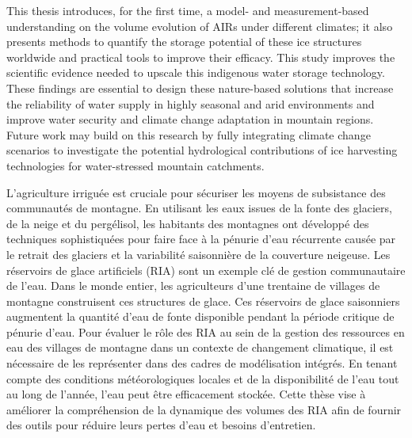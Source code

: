 This thesis introduces, for the first time, a model- and measurement-based understanding on the volume evolution
of AIRs under different climates; it also presents methods to quantify the storage potential of these ice
structures worldwide and practical tools to improve their efficacy. This study improves the scientific evidence
needed to upscale this indigenous water storage technology. These findings are essential to design these
nature-based solutions that increase the reliability of water supply in highly seasonal and arid environments
and improve water security and climate change adaptation in mountain regions. Future work may build on this
research by fully integrating climate change scenarios to investigate the potential hydrological contributions
of ice harvesting technologies for water-stressed mountain catchments.


L'agriculture irriguée est cruciale pour sécuriser les moyens de subsistance des communautés de montagne. En utilisant les eaux issues de la fonte des glaciers, de la neige et du pergélisol, les habitants des montagnes ont développé des techniques sophistiquées pour faire face à la pénurie d'eau récurrente causée par le retrait des glaciers et la variabilité saisonnière de la couverture neigeuse. Les réservoirs de glace artificiels (RIA) sont un exemple clé de gestion communautaire de l'eau. Dans le monde entier, les agriculteurs d'une trentaine de villages de montagne construisent ces structures de glace. Ces réservoirs de glace saisonniers augmentent la quantité d’eau de fonte disponible pendant la période critique de pénurie d'eau. Pour évaluer le rôle des RIA au sein de la gestion des ressources en eau des villages de montagne dans un contexte de changement climatique, il est nécessaire de les représenter dans des cadres de modélisation intégrés. En tenant compte des conditions météorologiques locales et de la disponibilité de l'eau tout au long de l'année, l'eau peut être efficacement stockée. Cette thèse vise à améliorer la compréhension de la dynamique des volumes des RIA afin de fournir des outils pour réduire leurs pertes d'eau et besoins d'entretien. 


